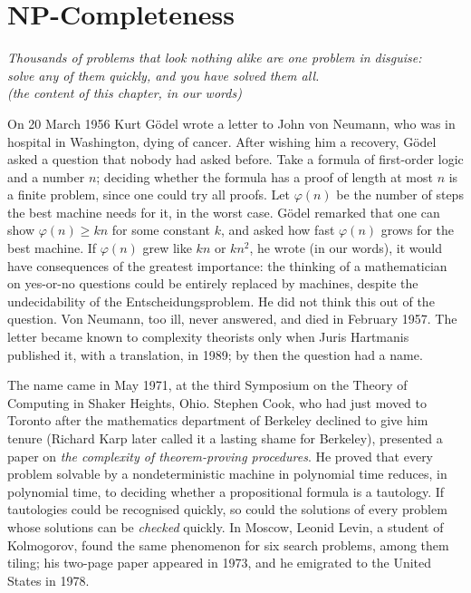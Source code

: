 \chapter{NP-Completeness}\label{ch:npcomplete}

\begin{center}\itshape
Thousands of problems that look nothing alike are one problem in disguise:\\
solve any of them quickly, and you have solved them all.\\
\upshape(the content of this chapter, in our words)
\end{center}

On 20 March 1956 Kurt Gödel wrote a letter to John von Neumann, who was in hospital in Washington, dying of cancer. After wishing him a recovery, Gödel asked a question that nobody had asked before. Take a formula of first-order logic and a number $n$; deciding whether the formula has a proof of length at most $n$ is a finite problem, since one could try all proofs. Let $\varphi(n)$ be the number of steps the best machine needs for it, in the worst case. Gödel remarked that one can show $\varphi(n)\ge kn$ for some constant $k$, and asked how fast $\varphi(n)$ grows for the best machine. If $\varphi(n)$ grew like $kn$ or $kn^2$, he wrote (in our words), it would have consequences of the greatest importance: the thinking of a mathematician on yes-or-no questions could be entirely replaced by machines, despite the undecidability of the Entscheidungsproblem. He did not think this out of the question. Von Neumann, too ill, never answered, and died in February 1957. The letter became known to complexity theorists only when Juris Hartmanis published it, with a translation, in 1989; by then the question had a name.

The name came in May 1971, at the third Symposium on the Theory of Computing in Shaker Heights, Ohio. Stephen Cook, who had just moved to Toronto after the mathematics department of Berkeley declined to give him tenure (Richard Karp later called it a lasting shame for Berkeley), presented a paper on \emph{the complexity of theorem-proving procedures}. He proved that every problem solvable by a nondeterministic machine in polynomial time reduces, in polynomial time, to deciding whether a propositional formula is a tautology. If tautologies could be recognised quickly, so could the solutions of every problem whose solutions can be \emph{checked} quickly. In Moscow, Leonid Levin, a student of Kolmogorov, found the same phenomenon for six search problems, among them tiling; his two-page paper appeared in 1973, and he emigrated to the United States in 1978.

